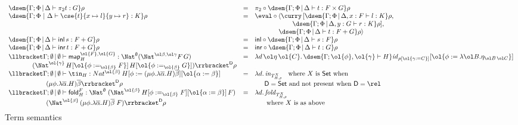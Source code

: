 \documentclass{lmcs}
\theoremstyle{plain}\newtheorem{satz}[thm]{Satz}
\newcommand{\inl}{\mathsf{inl}}
\newcommand{\inr}{\mathsf{inr}}
\newcommand{\fold}{\mathsf{fold}}
\newcommand{\set}{\mathsf{Set}}
\renewcommand{\id}{\mathit{id}}
\newcommand{\map}{\mathsf{map}}
\begin{document}
\begin{figure*}
\begin{adjustbox}{varwidth=7.2in, max width=5.8in, fbox, center}
\[\begin{array}{lll}
\dsem{\Gamma;\Phi \,|\, \Delta \vdash \pi_2 t : G}\rho & = &
\pi_2 \circ \dsem{\Gamma;\Phi \,|\, \Delta \vdash t : F \times
  G} \rho\\
\dsem{\Gamma;\Phi~|~\Delta \vdash \cse{t}{x \mapsto l}{y \mapsto r} :
  K}\rho & = & \eval \circ \langle \curry \,[\dsem{\Gamma;\Phi
    \,|\, \Delta, x : F \vdash l : K}\rho,\\
   & & \hspace*{0.79in} \dsem{\Gamma;\Phi \,|\, \Delta, y
    : G \vdash r : K}\rho],\\
   & &  \hspace*{0.5in} \dsem{\Gamma;\Phi \,|\, \Delta \vdash t :
  F + G} \rho\rangle\\   
\dsem{\Gamma;\Phi \,|\, \Delta \vdash \inl \,s: F + G} \rho& = &
\inl \circ \dsem{\Gamma;\Phi \,|\, \Delta \vdash s: F}\rho\\
\dsem{\Gamma;\Phi \,|\, \Delta \vdash \inr \,t: F + G}\rho & = & 
\inr \circ \dsem{\Gamma;\Phi \,|\, \Delta \vdash t : G}\rho\\
\llbracket \Gamma;\emptyset \,|\, \emptyset \vdash \map^{\ol{F},\ol{G}}_H
  : \Nat^\emptyset (\Nat^{\ol\beta,\ol\gamma} F\,G)
& = & \lambda d\, \ol\eta\,\ol{C}.\,
\dsem{\Gamma; \ol{\phi},\ol{\gamma}\vdash H}\id_{\rho[\ol{\gamma:=
      C}]}[\ol{\phi := \lambda \ol B. \eta_{\ol B\, \ol C}}]\\ 
\hspace*{0.5in}
  (\Nat^{\ol{\gamma}}\,H[\ol{\phi :=_{\ol{\beta}} F}]\,H[\ol{\phi
      :=_{\ol{\beta}} G}]) \rrbracket^{\mathsf D} \rho & &\\
\llbracket \Gamma;\emptyset \,|\, \emptyset \vdash \tin_H :
Nat^{\ol{\beta}} \, H[\phi := (\mu \phi.\lambda {\overline
    \alpha}.H){\overline \beta}][\ol{\alpha := \beta}] & = &
\lambda
d.\,\mathit{in}_{{T}^X_{H,\rho}} \;\;\mbox{ where } X \mbox{ is } \set \mbox{ when } \\ 
\hspace*{0.79in}(\mu \phi.\lambda {\overline \alpha}.H){\overline
  \beta} \rrbracket^{\mathsf{D}} \rho & & \hspace*{0.2in}  
\mathsf{D} = \set \mbox{ and not present when }
\mathsf{D} = \rel\\  
\llbracket \Gamma;\emptyset \,|\, \emptyset \vdash
  \fold^F_H : \Nat^\emptyset\;(\Nat^{\ol{\beta}}\,H[\phi
    :=_{\ol{\beta}} F][\ol{\alpha := \beta}]\,F) & = &  
\lambda d. \,\mathit{fold}_{T^X_{H,\rho}} \\ 
\hspace*{0.79in}(\Nat^{{\ol{\beta}} }\,(\mu
  \phi.\lambda \overline \alpha.H)\overline \beta\;F)
\rrbracket^{\mathsf{D}} \rho & & \hspace*{0.2in} \mbox{ where } X \mbox{ is as above
}\vspace*{-0.1in} 
\end{array}\]
\caption{Term semantics}\label{fig:term-sem} 
\end{adjustbox}\vspace*{-0.05in}
\end{figure*}
\end{document}
